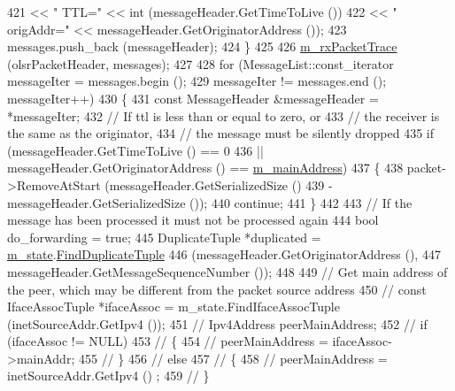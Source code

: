 \begin{DoxyCode}
421                     << \textcolor{stringliteral}{" TTL="} << \textcolor{keywordtype}{int} (messageHeader.GetTimeToLive ())
422                     << \textcolor{stringliteral}{" origAddr="} << messageHeader.GetOriginatorAddress ());
423       messages.push\_back (messageHeader);
424     \}
425 
426   \hyperlink{classns3_1_1olsr_1_1RoutingProtocol_a861b1d2ce370ab0137e67c5a1102a937}{m\_rxPacketTrace} (olsrPacketHeader, messages);
427 
428   \textcolor{keywordflow}{for} (MessageList::const\_iterator messageIter = messages.begin ();
429        messageIter != messages.end (); messageIter++)
430     \{
431       \textcolor{keyword}{const} MessageHeader &messageHeader = *messageIter;
432       \textcolor{comment}{// If ttl is less than or equal to zero, or}
433       \textcolor{comment}{// the receiver is the same as the originator,}
434       \textcolor{comment}{// the message must be silently dropped}
435       \textcolor{keywordflow}{if} (messageHeader.GetTimeToLive () == 0
436           || messageHeader.GetOriginatorAddress () == \hyperlink{classns3_1_1olsr_1_1RoutingProtocol_a58cc50ed5d1039aab603e90e318aabfb}{m\_mainAddress})
437         \{
438           packet->RemoveAtStart (messageHeader.GetSerializedSize ()
439                                  - messageHeader.GetSerializedSize ());
440           \textcolor{keywordflow}{continue};
441         \}
442 
443       \textcolor{comment}{// If the message has been processed it must not be processed again}
444       \textcolor{keywordtype}{bool} do\_forwarding = \textcolor{keyword}{true};
445       DuplicateTuple *duplicated = \hyperlink{classns3_1_1olsr_1_1RoutingProtocol_a07942ec1a7df71b609c8d2ff3b567c49}{m\_state}.\hyperlink{classns3_1_1olsr_1_1OlsrState_ab00d5bb24a075329d19cf44af31524d1}{FindDuplicateTuple}
446           (messageHeader.GetOriginatorAddress (),
447           messageHeader.GetMessageSequenceNumber ());
448 
449       \textcolor{comment}{// Get main address of the peer, which may be different from the packet source address}
450 \textcolor{comment}{//       const IfaceAssocTuple *ifaceAssoc = m\_state.FindIfaceAssocTuple (inetSourceAddr.GetIpv4 ());}
451 \textcolor{comment}{//       Ipv4Address peerMainAddress;}
452 \textcolor{comment}{//       if (ifaceAssoc != NULL)}
453 \textcolor{comment}{//         \{}
454 \textcolor{comment}{//           peerMainAddress = ifaceAssoc->mainAddr;}
455 \textcolor{comment}{//         \}}
456 \textcolor{comment}{//       else}
457 \textcolor{comment}{//         \{}
458 \textcolor{comment}{//           peerMainAddress = inetSourceAddr.GetIpv4 () ;}
459 \textcolor{comment}{//         \}}

\end{DoxyCode}
